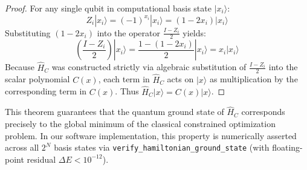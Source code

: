\begin{proof}
For any single qubit in computational basis state $|x_i\rangle$:
\begin{equation}
Z_i |x_i\rangle = (-1)^{x_i} |x_i\rangle = (1 - 2x_i) |x_i\rangle
\end{equation}
Substituting $(1 - 2x_i)$ into the operator $\frac{I - Z_i}{2}$ yields:
\begin{equation}
\left( \frac{I - Z_i}{2} \right) |x_i\rangle = \frac{1 - (1 - 2x_i)}{2} |x_i\rangle = x_i |x_i\rangle
\end{equation}
Because $\hat{H}_C$ was constructed strictly via algebraic substitution of $\frac{I - Z_i}{2}$ into the scalar polynomial $C(x)$, each term in $\hat{H}_C$ acts on $|x\rangle$ as multiplication by the corresponding term in $C(x)$. Thus $\hat{H}_C |x\rangle = C(x) |x\rangle$.
\end{proof}

This theorem guarantees that the quantum ground state of $\hat{H}_C$ corresponds precisely to the global minimum of the classical constrained optimization problem.
In our software implementation, this property is numerically asserted across all $2^N$ basis states via \texttt{verify\_hamiltonian\_ground\_state} (with floating-point residual $\Delta E < 10^{-12}$).
